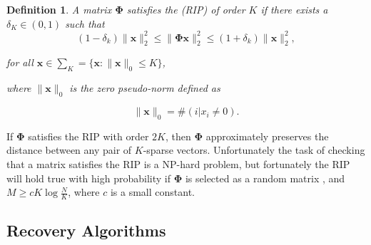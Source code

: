 \documentclass[conference]{IEEEtran}
\newtheorem{mydef}{Definition}
\begin{document}
\begin{mydef}
 A matrix $\boldsymbol{\Phi}$ satisfies the (RIP) of order $K$ if there exists a $\delta_K  \in (0,1)$ such that 
\begin{equation*}
  \label{eq:40}
  (1 - \delta_k)\|\boldsymbol{x}\|^2_2 \leq\|\boldsymbol{\Phi} \boldsymbol{x}\|^2_2 \leq (1 + \delta_k)\|\boldsymbol{x}\|^2_2,
\end{equation*}

for all $\boldsymbol{x} \in \sum_K = \{\boldsymbol{x}:\|\boldsymbol{x}\|_0 \leq K\} $, \newline

where $\|\boldsymbol{x}\|_0$ is the zero pseudo-norm defined as

\begin{equation*}
\|\boldsymbol{x}\|_0 = \#(i|x_i \neq 0). 
\end{equation*}
 
\end{mydef}

%

If $\boldsymbol{\Phi}$ satisfies the RIP with order $2K$, then $\boldsymbol{\Phi}$ approximately preserves the distance between any pair of $K$-sparse vectors. Unfortunately the task of checking that a matrix satisfies the RIP is a NP-hard problem, but fortunately the RIP will hold true with high probability if $\boldsymbol{\Phi}$ is selected as a random matrix \cite{Candes2006a}, and $M \geq cK\log \frac{N}{K}$, where $c$ is a small constant. 



\subsection{Recovery Algorithms}
\label{sec:recovery-algorithms}
\end{document}
